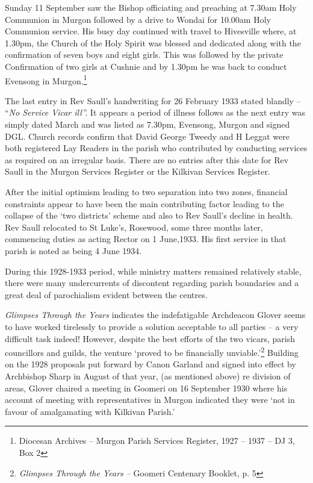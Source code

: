 Sunday 11 September saw the Bishop officiating and preaching at 7.30am Holy Communion in Murgon followed by a drive to Wondai for 10.00am Holy Communion service. His busy day continued with travel to Hivesville where, at 1.30pm, the Church of the Holy Spirit was blessed and dedicated along with the confirmation of seven boys and eight girls. This was followed by the private Confirmation of two girls at Cushnie and by 1.30pm he was back to conduct Evensong in Murgon.\footnote{Diocesan Archives -- Murgon Parish Services Register, 1927 -- 1937 -- DJ 3, Box 2}

The last entry in Rev Saull's handwriting for 26 February 1933 stated blandly -- ``\emph{No Service Vicar ill''.} It appears a period of illness follows as the next entry was simply dated March and was listed as 7.30pm, Evensong, Murgon and signed DGL. Church records confirm that David George Tweedy and H Leggat were both registered Lay Readers in the parish who contributed by conducting services as required on an irregular basis. There are no entries after this date for Rev Saull in the Murgon Services Register or the Kilkivan Services Register.

After the initial optimism leading to two separation into two zones, financial constraints appear to have been the main contributing factor leading to the collapse of the `two districts' scheme and also to Rev Saull's decline in health. Rev Saull relocated to St Luke's, Rosewood, some three months later, commencing duties as acting Rector on 1 June,1933. His first service in that parish is noted as being 4 June 1934.

During this 1928-1933 period, while ministry matters remained relatively stable, there were many undercurrents of discontent regarding parish boundaries and a great deal of parochialism evident between the centres.

\emph{Glimpses Through the Years} indicates the indefatigable Archdeacon Glover seems to have worked tirelessly to provide a solution acceptable to all parties -- a very difficult task indeed! However, despite the best efforts of the two vicars, parish councillors and guilds, the venture `proved to be financially unviable.'\footnote{\emph{Glimpses Through the Years --} Goomeri Centenary Booklet, p. 5} Building on the 1928 proposals put forward by Canon Garland and signed into effect by Archbishop Sharp in August of that year, (as mentioned above) re division of areas, Glover chaired a meeting in Goomeri on 16 September 1930 where his account of meeting with representatives in Murgon indicated they were `not in favour of amalgamating with Kilkivan Parish.'

